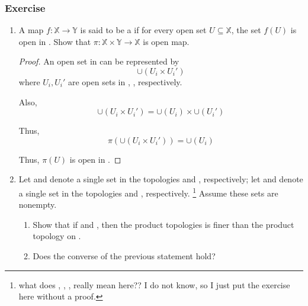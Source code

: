\subsubsection{Exercise}

\begin{enumerate}
      \item A map $ \mathit{f} : \mathbb{X} \rightarrow \mathbb{Y} $ is said to be a \label{def:OpenMap} if for every open set $ U \subseteq \mathbb{X} $, the set $ \mathit{f}(U) $ is open in . Show that $ \pi : \mathbb{X} \times \mathbb{Y} \rightarrow \mathbb{X} $ is open map.
      
      \begin{proof}
            An open set in  can be represented by 
            \begin{equation*}
                  \cup( U_{i} \times U_{i}' )
            \end{equation*}
            where $ U_{i}, U_{i}' $ are open sets in , , respectively.

            Also,
            \begin{equation*}
                  \cup( U_{i} \times U_{i}' ) = \cup( U_{i} ) \times \cup( U_{i}' )
            \end{equation*}

            Thus,
            \begin{equation*}
                  \pi(\cup( U_{i} \times U_{i}' )) = \cup( U_{i} )
            \end{equation*}

            Thus, $ \pi(U) $ is open in .
      \end{proof}

      \item Let  and  denote a single set in the topologies  and , respectively; let  and  denote a single set in the topologies  and , respectively. \footnote{
            what does , , ,  really mean here?? I do not know, so I just put the exercise here without a proof.
      } Assume these sets are nonempty.
      \begin{enumerate}
            \item Show that if  and , then the product topologies  is finer than the product topology on .
            \item Does the converse of the previous statement hold?
      \end{enumerate}


\end{enumerate}
